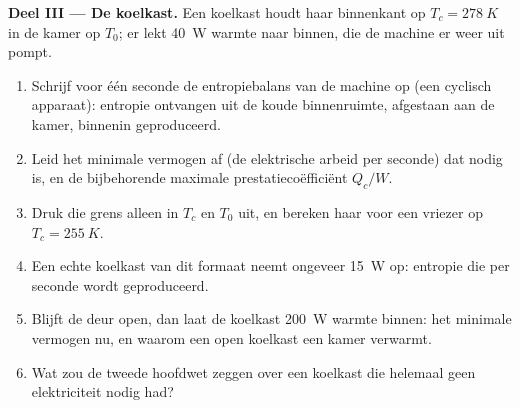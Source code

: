 \begin{problem}
\medskip
\noindent\textbf{Deel III --- De koelkast.}
Een koelkast houdt haar binnenkant op $T_c = \qty{278}{K}$ in de kamer op
$T_0$; er lekt \qty{40}{W} warmte naar binnen, die de machine er weer uit pompt.
\begin{enumerate}[resume]
  \item Schrijf voor één seconde de entropiebalans van de machine op (een
        cyclisch apparaat): entropie ontvangen uit de koude binnenruimte, afgestaan
        aan de kamer, binnenin geproduceerd.
  \item Leid het minimale vermogen af (de elektrische arbeid per seconde) dat nodig is,
        en de bijbehorende maximale prestatiecoëfficiënt
        $Q_c/W$.
  \item Druk die grens alleen in $T_c$ en $T_0$ uit, en bereken haar
        voor een vriezer op $T_c = \qty{255}{K}$.
  \item Een echte koelkast van dit formaat neemt ongeveer \qty{15}{W} op: entropie
        die per seconde wordt geproduceerd.
  \item Blijft de deur open, dan laat de koelkast \qty{200}{W} warmte binnen:
        het minimale vermogen nu, en waarom een open koelkast een kamer verwarmt.
  \item Wat zou de tweede hoofdwet zeggen over een koelkast die helemaal
        geen elektriciteit nodig had?
\end{enumerate}


\end{problem}
